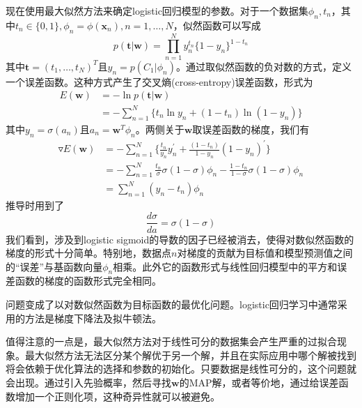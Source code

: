 现在使用最大似然方法来确定logistic回归模型的参数。对于一个数据集$\phi_n,t_n$，其中$t_n\in \{0,1\},\phi_n=\phi(\boldsymbol{x}_n),n=1,\dots,N$，似然函数可以写成
\begin{equation}
	p(\boldsymbol{t}|\boldsymbol{w})=\prod_{n=1}^{N}y_n^{t_n}\{1-y_n \}^{1-t_n}
\end{equation}
其中$\boldsymbol{t}=(t_1,\dots,t_N)^T$且$y_n=p(C_1|\phi_n)$。通过取似然函数的负对数的方式，定义一个误差函数。这种方式产生了交叉熵(cross-entropy)误差函数，形式为
\begin{equation}
	\begin{aligned}
	E(\boldsymbol{w})&=-\ln p(\boldsymbol{t}|\boldsymbol{w})\\
	&=-\sum_{n=1}^{N}\{t_n\ln y_n+(1-t_n)\ln (1-y_n) \}
	\end{aligned}
\end{equation}
其中$y_n=\sigma(a_n)$且$a_n=\boldsymbol{w}^T\phi_n$。两侧关于$\boldsymbol{w}$取误差函数的梯度，我们有
\begin{equation}
\begin{aligned}
	\triangledown E(\boldsymbol{w})&=-\sum_{n=1}^{N}\{\frac{t_n}{y_n}y_n^{'}+\frac{(1-t_n)}{1-y_n}(1-y_n)^{'} \}\\
	&=-\sum_{n=1}^{N}\frac{t_n}{\sigma}\sigma(1-\sigma)\phi_n - \frac{1-t_n}{1-\sigma}\sigma(1-\sigma)\phi_n\\
	&=\sum_{n=1}^{N}(y_n-t_n)\phi_n
\end{aligned}
\end{equation}
推导时用到了
\begin{equation}
	\frac{d\sigma}{da}=\sigma(1-\sigma)
\end{equation}
我们看到，涉及到logistic sigmoid的导数的因子已经被消去，使得对数似然函数的梯度的形式十分简单。特别地，数据点$n$对梯度的贡献为目标值和模型预测值之间的“误差”与基函数向量$\phi_n$相乘。此外它的函数形式与线性回归模型中的平方和误差函数的梯度的函数形式完全相同。

问题变成了以对数似然函数为目标函数的最优化问题。logistic回归学习中通常采用的方法是梯度下降法及拟牛顿法。

值得注意的一点是，最大似然方法对于线性可分的数据集会产生严重的过拟合现象。最大似然方法无法区分某个解优于另一个解，并且在实际应用中哪个解被找到将会依赖于优化算法的选择和参数的初始化。只要数据是线性可分的，这个问题就会出现。通过引入先验概率，然后寻找$\boldsymbol{w}$的MAP解，或者等价地，通过给误差函数增加一个正则化项，这种奇异性就可以被避免。
